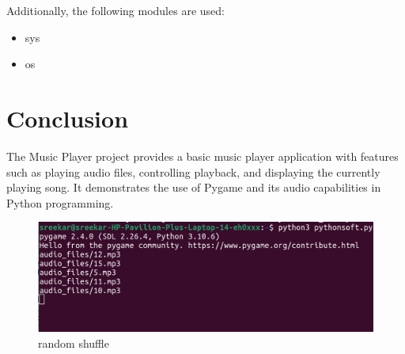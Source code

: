 \documentclass[journal,12pt,twocolumn]{IEEEtran}
\begin{document}
Additionally, the following modules are used:

\begin{itemize}
        \item sys
        \item os
\end{itemize}

\section{Conclusion}
The Music Player project provides a basic music player application with features such as playing audio files, controlling playback, and displaying the currently playing song. It demonstrates the use of Pygame and its audio capabilities in Python programming.

\begin{figure}
    \centering
    \includegraphics[width=\linewidth]{audio.png}
    \caption{random shuffle}
    \label{fig:my_label}
\end{figure}
\end{document}
